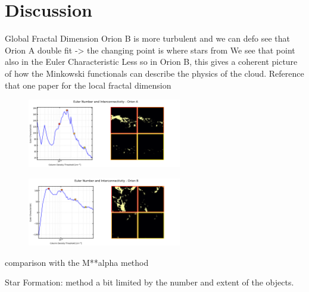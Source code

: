\chapter{Discussion}

Global Fractal Dimension 
Orion B is more turbulent and we can defo see that 
Orion A double fit -> the changing point is where stars from
We see that point also in the Euler Characteristic
Less so in Orion B, this gives a coherent picture of how the Minkowski functionals can describe the physics of the cloud.
Reference that one paper for the local fractal dimension

\begin{figure}[t]
    \centering
    \includegraphics[width=0.6\textwidth]{figures/euler_Orion_A.png}
    \caption{}
    \label{fig:Euler_Orion_A}
\end{figure}

\begin{figure}[t]
    \centering
    \includegraphics[width=0.6\textwidth]{figures/euler_Orion_B.png}
    \caption{}
    \label{fig:Euler_Orion_B}
\end{figure}

comparison with the M**alpha method

Star Formation: method a bit limited by the number and extent of the objects.